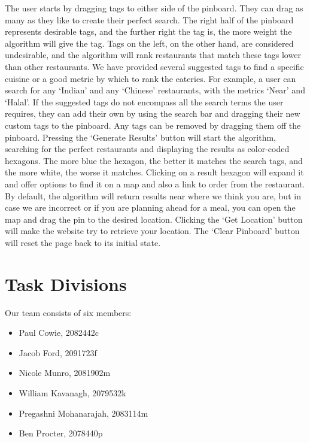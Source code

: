 \documentclass[10pt,a4paper]{article}
\begin{document}
The user starts by dragging tags to either side of the pinboard. They can drag as many as they like to create their perfect search. The right half of the pinboard represents desirable tags, and the further right the tag is, the more weight the algorithm will give the tag. Tags on the left, on the other hand, are considered undesirable, and the algorithm will rank restaurants that match these tags lower than other restaurants. We have provided several suggested tags to find a specific cuisine or a good metric by which to rank the eateries. For example, a user can search for any ‘Indian’ and any ‘Chinese’ restaurants, with the metrics ‘Near’ and ‘Halal’. If the suggested tags do not encompass all the search terms the user requires, they can add their own by using the search bar and dragging their new custom tags to the pinboard. Any tags can be removed by dragging them off the pinboard. Pressing the ‘Generate Results’ button will start the algorithm, searching for the perfect restaurants and displaying the results as color-coded hexagons. The more blue the hexagon, the better it matches the search tags, and the more white, the worse it matches. Clicking on a result hexagon will expand it and offer options to find it on a map and also a link to order from the restaurant. By default, the algorithm will return results near where we think you are, but in case we are incorrect or if you are planning ahead for a meal, you can open the map and drag the pin to the desired location. Clicking the ‘Get Location’ button will make the website try to retrieve your location. The ‘Clear Pinboard’ button will reset the page back to its initial state.

\section*{Task Divisions}

Our team consists of six members:
\begin{itemize}
	\item Paul Cowie, 2082442c
	\item Jacob Ford, 2091723f
	\item Nicole Munro, 2081902m
	\item William Kavanagh, 2079532k
	\item Pregashni Mohanarajah, 2083114m
	\item Ben Procter, 2078440p
\end{itemize}
\end{document}
